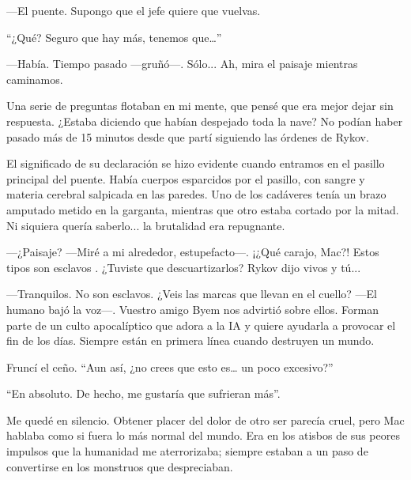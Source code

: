 —El puente. Supongo que el jefe quiere que vuelvas.

``¿Qué? Seguro que hay más, tenemos que…''

—Había. Tiempo pasado —gruñó—. Sólo... Ah, mira el paisaje mientras caminamos.

Una serie de preguntas flotaban en mi mente, que pensé que era mejor dejar sin respuesta. ¿Estaba diciendo que habían despejado toda la nave? No podían haber pasado más de 15 minutos desde que partí siguiendo las órdenes de Rykov.

El significado de su declaración se hizo evidente cuando entramos en el pasillo principal del puente. Había cuerpos esparcidos por el pasillo, con sangre y materia cerebral salpicada en las paredes. Uno de los cadáveres tenía un brazo amputado metido en la garganta, mientras que otro estaba cortado por la mitad. Ni siquiera quería saberlo... la brutalidad era repugnante.

—¿Paisaje? —Miré a mi alrededor, estupefacto—. ¡¿Qué carajo, Mac?! Estos tipos son esclavos . ¿Tuviste que descuartizarlos? Rykov dijo vivos y tú...

—Tranquilos. No son esclavos. ¿Veis las marcas que llevan en el cuello? —El humano bajó la voz—. Vuestro amigo Byem nos advirtió sobre ellos. Forman parte de un culto apocalíptico que adora a la IA y quiere ayudarla a provocar el fin de los días. Siempre están en primera línea cuando destruyen un mundo.

Fruncí el ceño. ``Aun así, ¿no crees que esto es… un poco excesivo?''

``En absoluto. De hecho, me gustaría que sufrieran más''.

Me quedé en silencio. Obtener placer del dolor de otro ser parecía cruel, pero Mac hablaba como si fuera lo más normal del mundo. Era en los atisbos de sus peores impulsos que la humanidad me aterrorizaba; siempre estaban a un paso de convertirse en los monstruos que despreciaban.